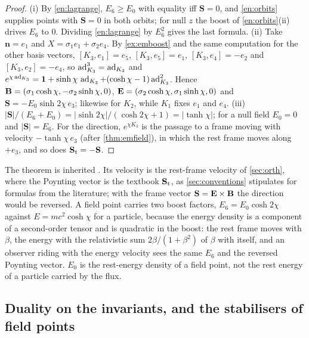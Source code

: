 \begin{proof}
(i) By \eqref{en:lagrange}, $E_6\ge E_0$ with equality iff $\mathbf S=0$, and \cref{en:orbits} supplies points with $\mathbf S=0$ in both orbits; for null
$z$ the boost of \cref{en:orbits}(ii) drives $E_6$ to $0$. Dividing \eqref{en:lagrange} by $E_6^2$ gives the last formula. (ii) Take $\mathbf n=e_1$
and $X=\sigma_1e_1+\sigma_2e_4$. By \cref{ex:emboost} and the same computation for the other basis vectors, $[K_3,e_1]=e_5$, $[K_3,e_5]=e_1$,
$[K_3,e_4]=-e_2$ and $[K_3,e_2]=-e_4$, so $\operatorname{ad}_{K_3}^3=\operatorname{ad}_{K_3}$ and $e^{\chi\operatorname{ad}_{K_3}}=\mathbf 1+\sinh\chi\,\operatorname{ad}_{K_3}+(\cosh\chi-1)\operatorname{ad}_{K_3}^2$. Hence
$\mathbf B=(\sigma_1\cosh\chi,-\sigma_2\sinh\chi,0)$, $\mathbf E=(\sigma_2\cosh\chi,\sigma_1\sinh\chi,0)$ and $\mathbf S=-E_0\sinh2\chi\,e_3$; likewise for $K_2$,
while $K_1$ fixes $e_1$ and $e_4$. (iii) $|\mathbf S|/(E_6+E_0)=|\sinh2\chi|/(\cosh2\chi+1)=|\tanh\chi|$; for a null field $E_0=0$ and $|\mathbf S|=E_6$. For the direction, $e^{\chi K_3}$ is the passage to
a frame moving with velocity $-\tanh\chi\,e_3$ (after \cref{thm:emfield}), in which the rest frame moves along $+e_3$, and so does
$\mathbf S_{\rm t}=-\mathbf S$.
\end{proof}

The theorem is inherited \cite{LandauLifshitz2}. Its velocity is the rest-frame velocity of \cref{sec:orth}, where the Poynting vector is the
textbook $\mathbf S_{\rm t}$, as \cref{sec:conventions} stipulates for formulas from the literature; with the frame vector $\mathbf S=\mathbf E\times\mathbf B$
the direction would be reversed. A field point carries two boost factors, $E_6=E_0\cosh2\chi$ against $E=mc^2\cosh\chi$ for a particle, because the
energy density is a component of a second-order tensor and is quadratic in the boost: the rest frame moves with $\beta$, the energy with the
relativistic sum $2\beta/(1+\beta^2)$ of $\beta$ with itself, and an observer riding with the energy velocity sees the same $E_6$ and the reversed
Poynting vector. $E_0$ is the rest-energy density of a field point, not the rest energy of a particle carried by the flux.

\subsection{Duality on the invariants, and the stabilisers of field points}
\label{sec:energy-duality}

